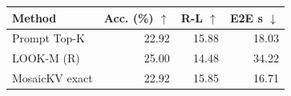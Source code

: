 \begin{tabular}{lrrr}
\toprule
Method & Acc. (\%) $\uparrow$ & R-L $\uparrow$ & E2E s $\downarrow$\\\midrule
Prompt Top-K & 22.92 & 15.88 & 18.03\\
LOOK-M (R) & 25.00 & 14.48 & 34.22\\
MosaicKV exact & 22.92 & 15.85 & 16.71\\
\bottomrule
\end{tabular}
